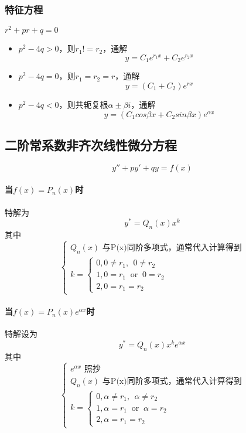 \subsubsection{特征方程}
\(r^2 + pr + q = 0\)
\begin{itemize}
    \item \(p^2 - 4q > 0\)，则\(r_1 != r_2\)，通解\[y = C_1e^{r_1x} + C_2e^{r_2x}\]
    \item \(p^2 - 4q = 0\)，则\(r_1 = r_2 = r\)，通解\[y = (C_1 + C_2)e^{rx}\]
    \item \(p^2 - 4q < 0\)，则共轭复根\(\alpha \pm \beta i\)，通解\[y = (C_1cos\beta x + C_2sin\beta x)e^{\alpha x}\]
\end{itemize}


\subsection{二阶常系数非齐次线性微分方程}
\[y'' + py' + qy = f(x)\]


\paragraph{当\(f(x) = P_n(x)\)时}
特解为\[y^* = Q_n(x)x^k\]其中
\[\begin{cases}
    Q_n(x)\text{ 与P(x)同阶多项式，通常代入计算得到} \\
    k = \begin{cases}
        0, 0 \neq r_1,\ \ 0 \neq r_2 \\ 
        1, 0 = r_1\ \text{ or }\ 0 = r_2 \\ 
        2, 0 = r_1 = r_2
    \end{cases}
\end{cases}\]

\paragraph{当\(f(x) = P_n(x)e^{\alpha x}\)时}
特解设为
\[y^* = Q_n(x)x^ke^{\alpha x}\]其中
\[\begin{cases}
    e^{\alpha x}\text{ 照抄} \\
    Q_n(x)\text{ 与P(x)同阶多项式，通常代入计算得到} \\
    k = \begin{cases}
        0, \alpha \neq r_1,\ \ \alpha \neq r_2 \\ 
        1, \alpha = r_1\ \text{ or }\ \alpha = r_2 \\ 
        2, \alpha = r_1 = r_2
    \end{cases}
\end{cases}\]

